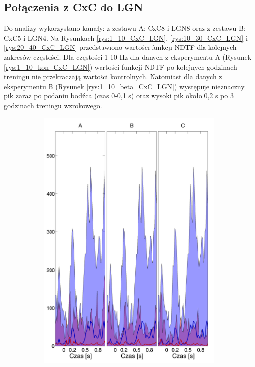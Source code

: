 \documentclass{pracamgr_2}
\begin{document}
	\subsection{Połączenia z CxC do LGN}
	Do analizy wykorzystano kanały: z zestawu A: CxC8 i LGN8 oraz z zestawu B: CxC5 i LGN4.
	Na Rysunkach \ref{rys:1_10_CxC_LGN}, \ref{rys:10_30_CxC_LGN} i \ref{rys:20_40_CxC_LGN} przedstawiono wartości funkcji NDTF dla kolejnych zakresów częstości. Dla częstości 1-10 Hz dla danych z eksperymentu A (Rysunek \ref{rys:1_10_kon_CxC_LGN}) wartości funkcji NDTF po kolejnych godzinach treningu nie przekraczają wartości kontrolnych. Natomiast dla danych z eksperymentu B (Rysunek \ref{rys:1_10_beta_CxC_LGN}) występuje  nieznaczny pik zaraz po podaniu bodźca (czas 0-0,1 s) oraz wysoki pik około 0,2 s po 3 godzinach treningu wzrokowego. 
		\begin{figure}[h]
		\begin{subfigure}{.5\textwidth}
			\centering
			\includegraphics[width=1.\linewidth]{kontrola15_1-10_z_CxC8_do_LGN82.png}

\end{subfigure}
\end{figure}
\end{document}
